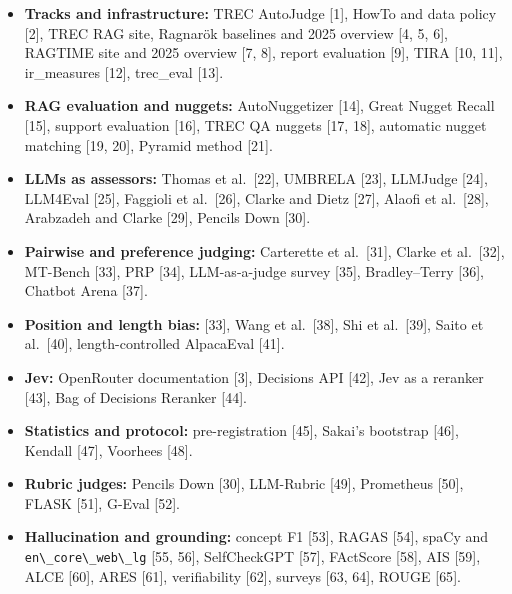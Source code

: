 \documentclass[
  10pt,
]{article}
\newcommand{\passthrough}[1]{#1}
\providecommand{\tightlist}{%
  \setlength{\itemsep}{0pt}\setlength{\parskip}{0pt}}
\begin{document}
\begin{itemize}
\tightlist
\item
  \textbf{Tracks and infrastructure:} TREC AutoJudge {[}1{]}, HowTo and
  data policy {[}2{]}, TREC RAG site, Ragnarök baselines and 2025
  overview {[}4, 5, 6{]}, RAGTIME site and 2025 overview {[}7, 8{]},
  report evaluation {[}9{]}, TIRA {[}10, 11{]}, ir\_measures {[}12{]},
  trec\_eval {[}13{]}.
\item
  \textbf{RAG evaluation and nuggets:} AutoNuggetizer {[}14{]}, Great
  Nugget Recall {[}15{]}, support evaluation {[}16{]}, TREC QA nuggets
  {[}17, 18{]}, automatic nugget matching {[}19, 20{]}, Pyramid method
  {[}21{]}.
\item
  \textbf{LLMs as assessors:} Thomas et al.~{[}22{]}, UMBRELA {[}23{]},
  LLMJudge {[}24{]}, LLM4Eval {[}25{]}, Faggioli et al.~{[}26{]}, Clarke
  and Dietz {[}27{]}, Alaofi et al.~{[}28{]}, Arabzadeh and Clarke
  {[}29{]}, Pencils Down {[}30{]}.
\item
  \textbf{Pairwise and preference judging:} Carterette et al.~{[}31{]},
  Clarke et al.~{[}32{]}, MT-Bench {[}33{]}, PRP {[}34{]},
  LLM-as-a-judge survey {[}35{]}, Bradley--Terry {[}36{]}, Chatbot Arena
  {[}37{]}.
\item
  \textbf{Position and length bias:} {[}33{]}, Wang et al.~{[}38{]}, Shi
  et al.~{[}39{]}, Saito et al.~{[}40{]}, length-controlled AlpacaEval
  {[}41{]}.
\item
  \textbf{Jev:} OpenRouter documentation {[}3{]}, Decisions API
  {[}42{]}, Jev as a reranker {[}43{]}, Bag of Decisions Reranker
  {[}44{]}.
\item
  \textbf{Statistics and protocol:} pre-registration {[}45{]}, Sakai's
  bootstrap {[}46{]}, Kendall {[}47{]}, Voorhees {[}48{]}.
\item
  \textbf{Rubric judges:} Pencils Down {[}30{]}, LLM-Rubric {[}49{]},
  Prometheus {[}50{]}, FLASK {[}51{]}, G-Eval {[}52{]}.
\item
  \textbf{Hallucination and grounding:} concept F1 {[}53{]}, RAGAS
  {[}54{]}, spaCy and \passthrough{\lstinline!en\_core\_web\_lg!} {[}55,
  56{]}, SelfCheckGPT {[}57{]}, FActScore {[}58{]}, AIS {[}59{]}, ALCE
  {[}60{]}, ARES {[}61{]}, verifiability {[}62{]}, surveys {[}63, 64{]},
  ROUGE {[}65{]}.
\end{itemize}
\end{document}
